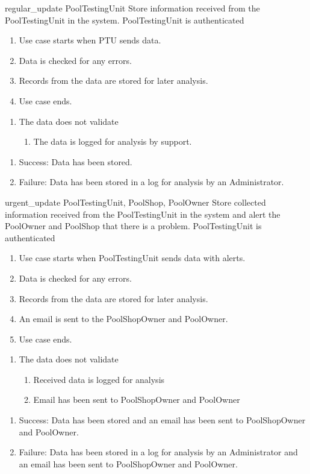 \usecase
{regular\_update}
{PoolTestingUnit}
{Store information received from the PoolTestingUnit in the system.}
{PoolTestingUnit is authenticated}
{
\begin{enumerate}
\item Use case starts when PTU sends data.
\item Data is checked for any errors.
\item Records from the data are stored for later analysis.
\item Use case ends.
\end{enumerate}
}
{
\begin{enumerate}
\item The data does not validate
\begin{enumerate}
\item The data is logged for analysis by support.
\end{enumerate}
\end{enumerate}
}
{\begin{enumerate}
\item Success: Data has been stored.
\item Failure: Data has been stored in a log for analysis by an Administrator.
\end{enumerate}
}

\usecase
{urgent\_update}
{PoolTestingUnit, PoolShop, PoolOwner}
{Store collected information received from the PoolTestingUnit in the system and alert the PoolOwner and PoolShop that there is a problem.}
{PoolTestingUnit is authenticated}
{
\begin{enumerate}
\item Use case starts when PoolTestingUnit sends data with alerts.
\item Data is checked for any errors.
\item Records from the data are stored for later analysis.
\item An email is sent to the PoolShopOwner and PoolOwner.
\item Use case ends.
\end{enumerate}
}
{
\begin{enumerate}
\item The data does not validate
\begin{enumerate}
\item Received data is logged for analysis
\item Email has been sent to PoolShopOwner and PoolOwner
\end{enumerate}
\end{enumerate}
}
{
\begin{enumerate}
\item Success: Data has been stored and an email has been sent to PoolShopOwner and PoolOwner.
\item Failure: Data has been stored in a log for analysis by an Administrator and an email has been sent to PoolShopOwner and PoolOwner.
\end{enumerate}
}

